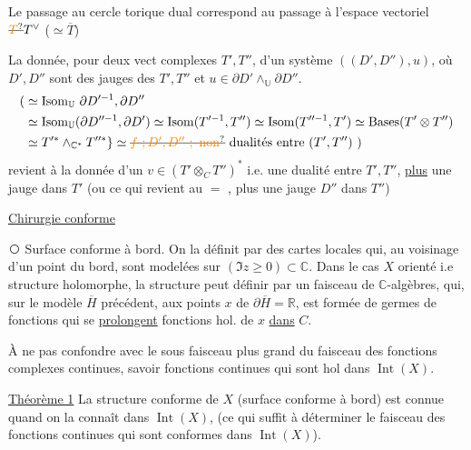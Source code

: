 Le passage au cercle torique  dual correspond au passage à l'espace vectoriel    $\deleted{\unsure{T}}T^\vee$ ($\simeq\overline T$)

La donnée, pour deux   vect complexes $T',T''$, d'un système $((D',D''),u)$, où $D',D''$ sont des jauges des $T',T''$ et $u\in\partial D'\mathbin{\wedge}_{\mathbb U}\partial D''$.
\[
\begin{aligned}
(&\simeq\operatorname{Isom}_{\mathbb U}\,\partial D'^{-1},\partial D''\\
 &\simeq\operatorname{Isom}_{\mathbb U}(\partial D''^{-1},\partial D')
 \simeq\operatorname{Isom}(T'^{-1},T'')\simeq\operatorname{Isom}(T''^{-1},T')\simeq\mathrm{Bases}(T'\otimes T'')\\
 &\simeq T'^{*}\mathbin{\wedge}_{\mathbb C^{*}}T''^{*}\}\simeq
 \deleted{\unsure{f\ ;D',D''\ ;\ \text{non}}}\ \text{dualités entre }(T',T'')\ )
\end{aligned}
\]
revient à la donnée d'un $v\in(T'\otimes_{C}T'')^{*}$ i.e. une dualité entre $T',T''$, \uline{plus} une jauge  dans $T'$ (ou ce qui revient au $=$  , plus une jauge $D''$ dans $T''$)


\uline{}

\uline{Chirurgie conforme}

\textcircled{} Surface conforme à bord. On  la définit par des cartes locales qui, au voisinage d'un point du bord, sont modelées sur  $(\Im z\geq 0)\subset\mathbb C$. Dans le cas $X$ orienté i.e structure holomorphe, la structure peut  définir par un faisceau de $\mathbb C$-algèbres, qui, sur le modèle $\overline H$ précédent, aux points $x$ de $\partial\overline H=\mathbb R$, est formée de germes de fonctions qui se \uline{prolongent}  fonctions hol.   de $x$ \uline{dans} $C$.

À ne pas confondre avec le sous faisceau plus grand du faisceau des fonctions complexes continues, savoir   fonctions continues qui sont hol dans $\operatorname{Int}(X)$.

\uline{Théorème 1} La structure conforme de $X$ (surface conforme à bord) est connue quand on la connaît dans $\operatorname{Int}(X)$, (ce qui suffit à déterminer le faisceau des fonctions  continues qui sont conformes dans $\operatorname{Int}(X)$).

